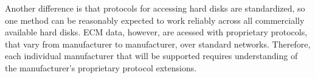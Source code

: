 Another difference is that protocols for accessing hard disks are standardized, so one method can be reasonably expected
to work reliably across all commercially available hard disks. ECM data, however, are acessed with proprietary protocols,
that vary from manufacturer to manufacturer, over standard networks. 
Therefore, each individual manufacturer that will be supported requires understanding of the  manufacturer's proprietary protocol extensions.

